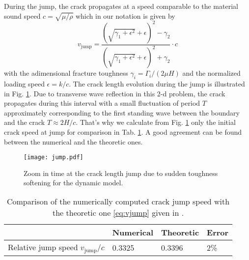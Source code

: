 During the jump, the crack propagates at a speed comparable to the material sound speed $c=\sqrt{\mu/\rho}$ which in our notation is given by
\begin{equation} \label{eq:vjump}
v_\mathrm{jump}=\frac{\left(\sqrt{\gamma_1+\epsilon^2}+\epsilon\right)^2-\gamma_2}{\left(\sqrt{\gamma_1+\epsilon^2}+\epsilon\right)^2+\gamma_2}\cdot c
\end{equation}
with the adimensional fracture toughness $\gamma_i=\Gamma_i/(2\mu H)$ and the normalized loading speed $\epsilon=k/c$. The crack length evolution during the jump is illustrated in Fig. \ref{fig:softGcqs_jump}. Due to transverse wave reflection in this 2-d problem, the crack propagates during this interval with a small fluctuation of period $T$ approximately corresponding to the first standing wave between the boundary and the crack $T\approx 2H/c$. That's why we calculate from Fig. \ref{fig:softGcqs_jump} only the initial crack speed at jump for comparison in Tab. \ref{tab:compjumpv}. A good agreement can be found between the numerical and the theoretic ones.
\begin{figure}[htbp]
\centering
\texttt{[image: jump.pdf]}
\caption{Zoom in time at the crack length jump due to sudden toughness softening for the dynamic model.} \label{fig:softGcqs_jump}
\end{figure}
\begin{table}[htbp]
\centering
\caption{Comparison of the numerically computed crack jump speed with the theoretic one \eqref{eq:vjump} given in \cite{DumouchelMarigoCharlotte:2008}.} \label{tab:compjumpv}
\begin{tabular}{llll} \toprule
& Numerical & Theoretic & Error \\ \midrule
Relative jump speed $v_\mathrm{jump}/c$ & 0.3325 & 0.3396 & 2\% \\ \bottomrule
\end{tabular}
\end{table}

